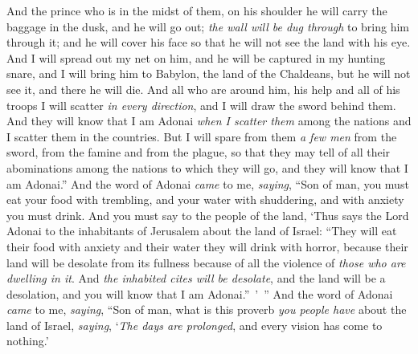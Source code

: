\begin{biblechapter}
\verse And the prince who is in the midst of them, on his shoulder he will carry the baggage in the dusk, and he will go out; \textit{the wall will be dug through} to bring him through it; and he will cover his face so that he will not see the land with his eye.
\verse And I will spread out my net on him, and he will be captured in my hunting snare, and I will bring him to Babylon, the land of the Chaldeans, but he will not see it, and there he will die.
\verse And all who are around him, his help and all of his troops I will scatter \textit{in every direction}, and I will draw the sword behind them.
\verse And they will know that I am Adonai \textit{when I scatter them} among the nations and I scatter them in the countries.
\verse But I will spare from them \textit{a few men} from the sword, from the famine and from the plague, so that they may tell of all their abominations among the nations to which they will go, and they will know that I am Adonai.”
\verse And the word of Adonai \textit{came} to me, \textit{saying},
\verse “Son of man, you must eat your food with trembling, and your water with shuddering, and with anxiety you must drink.
\verse And you must say to the people of the land, ‘Thus says the Lord Adonai to the inhabitants of Jerusalem about the land of Israel: “They will eat their food with anxiety and their water they will drink with horror, because their land will be desolate from its fullness because of all the violence of \textit{those who are dwelling in it}.
\verse And \textit{the inhabited cites will be desolate}, and the land will be a desolation, and you will know that I am Adonai.” ’ ”
\verse And the word of Adonai \textit{came} to me, \textit{saying},
\verse “Son of man, what is this proverb \textit{you people have} about the land of Israel, \textit{saying}, ‘\textit{The days are prolonged}, and every vision has come to nothing.’

\end{biblechapter}
